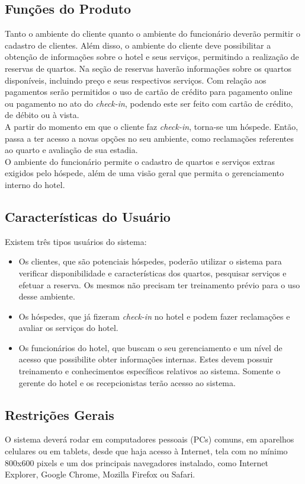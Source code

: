 \documentclass[notitlepage]{article}
\begin{document}
\subsection{Funções do Produto}
Tanto o ambiente do cliente quanto o ambiente do funcionário deverão permitir o cadastro de clientes. Além disso, o ambiente do cliente deve possibilitar a obtenção de informações sobre o hotel e seus serviços, permitindo a realização de reservas de quartos. Na seção de reservas haverão informações sobre os quartos disponíveis, incluindo preço e seus respectivos serviços. Com relação aos pagamentos serão permitidos o uso de cartão de crédito para pagamento online ou pagamento no ato do \textit{check-in}, podendo este ser feito com cartão de crédito, de débito ou à vista. \\
\indent A partir do momento em que o cliente faz \textit{check-in}, torna-se um hóspede. Então, passa a ter acesso a novas opções no seu ambiente, como reclamações referentes ao quarto e avaliação de sua estadia.\\
\indent O ambiente do funcionário permite o cadastro de quartos e serviços extras exigidos pelo hóspede, além de uma visão geral que permita o gerenciamento interno do hotel.
\subsection{Características do Usuário}
Existem três tipos usuários do sistema:
\begin{itemize}
\item Os clientes, que são potenciais hóspedes, poderão utilizar o sistema para verificar disponibilidade e características dos quartos, pesquisar serviços e efetuar a reserva. Os mesmos não precisam ter treinamento prévio para o uso desse ambiente. 
\item Os hóspedes, que já fizeram \textit{check-in} no hotel e podem fazer reclamações e avaliar os serviços do hotel. 
\item Os funcionários do hotel, que buscam o seu gerenciamento e um nível de acesso que possibilite obter informações internas. Estes devem possuir treinamento e conhecimentos específicos relativos ao sistema. Somente o gerente do hotel e os recepcionistas terão acesso ao sistema.
\end{itemize}
\subsection{Restrições Gerais}
O sistema deverá rodar em computadores pessoais (PCs) comuns, em aparelhos celulares ou em tablets, desde que haja acesso à Internet, tela com no mínimo 800x600 pixels e um dos principais navegadores instalado, como Internet Explorer, Google Chrome, Mozilla Firefox ou Safari. 
\end{document}
